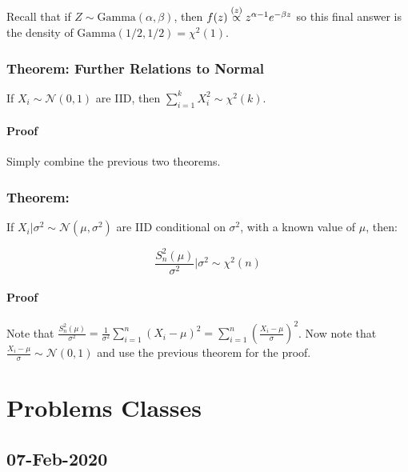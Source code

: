 \documentclass[a4paper]{article}
\begin{document}
                    Recall that if $Z \sim \text{Gamma}(\alpha, \beta)$, then
                    $f(z) \stackrel{({z})}{\propto} z^{\alpha - 1}e^{-\beta z}$ so this final
                    answer is the density of $\text{Gamma}(1/2, 1/2) =
                    \chi^2(1)$.

            \subsubsection{Theorem: Further Relations to Normal}
                If $X_i \sim \mathcal{N}(0, 1)$ are IID, then $\sum\limits_{i=1}
                ^k X_i^2 \sim \chi^2(k)$.

                \paragraph{Proof}
                    Simply combine the previous two theorems.

            \subsubsection{Theorem:}
                If $X_i | \sigma^2 \sim \mathcal{N}(\mu, \sigma^2)$ are IID
                conditional on $\sigma^2$, with a known value of $\mu$, then:

                \[
                    \frac{S_n^2(\mu)}{\sigma^2} | \sigma^2 \sim \chi^2(n)
                \]

                \paragraph{Proof}
                    Note that $\frac{S_n^2(\mu)}{\sigma^2} = \frac{1}{\sigma^2}
                    \sum\limits_{i=1}^n (X_i - \mu)^2 = \sum\limits_{i=1}^n
                    \left(\frac{X_i - \mu}{\sigma}\right)^2$. Now note that
                    $\frac{X_i - \mu}{\sigma} \sim \mathcal{N}(0, 1)$ and use
                    the previous theorem for the proof.

    \newpage
    \section*{Problems Classes}
        \subsection*{07-Feb-2020}
\end{document}
